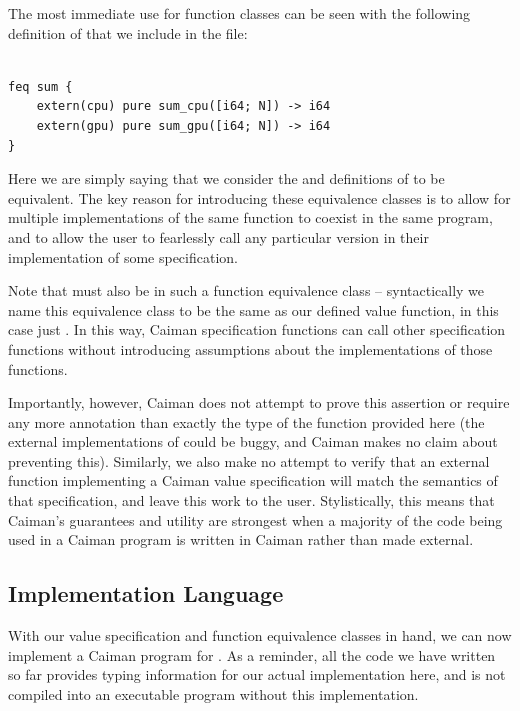 The most immediate use for function classes can be seen with the following definition of  that we include in the  file:
%
\begin{lstlisting}

feq sum {
    extern(cpu) pure sum_cpu([i64; N]) -> i64
    extern(gpu) pure sum_gpu([i64; N]) -> i64
}
\end{lstlisting}
%
Here we are simply saying that we consider the  and  definitions of  to be equivalent.  The key reason for introducing these equivalence classes is to allow for multiple implementations of the same function to coexist in the same program, and to allow the user to fearlessly call any particular version in their implementation of some specification.  

Note that  must also be in such a function equivalence class -- syntactically we name this equivalence class to be the same as our defined value function, in this case just .  In this way, Caiman specification functions can call other specification functions without introducing assumptions about the implementations of those functions.  

Importantly, however, Caiman does not attempt to prove this assertion or require any more annotation than exactly the type of the function provided here (the external implementations of  could be buggy, and Caiman makes no claim about preventing this).  Similarly, we also make no attempt to verify that an external function implementing a Caiman value specification will match the semantics of that specification, and leave this work to the user.  Stylistically, this means that Caiman's guarantees and utility are strongest when a majority of the code being used in a Caiman program is written in Caiman rather than made external.  

\subsection{Implementation Language}
\label{subsec:implementation}

With our value specification and function equivalence classes in hand, we can now implement a Caiman program for .  As a reminder, all the code we have written so far provides typing information for our actual implementation here, and is not compiled into an executable program without this implementation.

